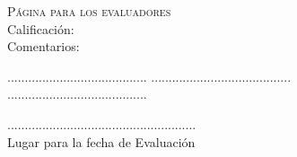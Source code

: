 { \vspace*{1cm} }

\Large{\textsc{P\'agina para los evaluadores}}\\[3cm]

\large{Calificaci\'on:}\\[1.8cm]

\large{Comentarios:}\\[5cm]

\begin{center}
........................................ \qquad\qquad\qquad\qquad ........................................\\[3.5cm]
........................................\\
\end{center}

\vfill

\begin{flushright}
......................................................\\
\large{Lugar para la fecha de Evaluaci\'on}
\end{flushright}

